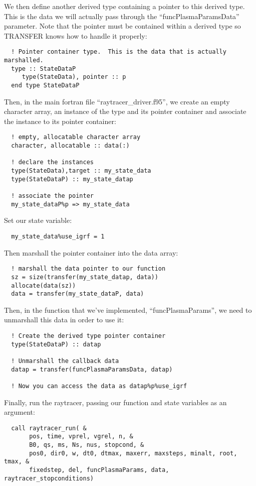 \documentclass[10pt]{article}
\begin{document}
We then define another derived type containing a pointer to this
derived type.  This is the data we will actually pass through the
``funcPlasmaParamsData'' parameter.  Note that the pointer must be
contained within a derived type so TRANSFER knows how to handle it
properly:
\begin{verbatim}
  ! Pointer container type.  This is the data that is actually marshalled.
  type :: StateDataP 
     type(StateData), pointer :: p
  end type StateDataP
\end{verbatim}

Then, in the main fortran file ``raytracer\_driver.f95'', we create an
empty character array, an instance of the type and its pointer
container and associate the instance to its pointer container:
\begin{verbatim}
  ! empty, allocatable character array
  character, allocatable :: data(:)

  ! declare the instances
  type(StateData),target :: my_state_data
  type(StateDataP) :: my_state_datap
  
  ! associate the pointer
  my_state_dataP%p => my_state_data
\end{verbatim}

Set our state variable:
\begin{verbatim}
  my_state_data%use_igrf = 1
\end{verbatim}

Then marshall the pointer container into the data array:
\begin{verbatim}
  ! marshall the data pointer to our function
  sz = size(transfer(my_state_datap, data))
  allocate(data(sz))
  data = transfer(my_state_dataP, data)
\end{verbatim}

Then, in the function that we've implemented, ``funcPlasmaParams'', we
need to unmarshall this data in order to use it:

\begin{verbatim}
  ! Create the derived type pointer container
  type(StateDataP) :: datap

  ! Unmarshall the callback data
  datap = transfer(funcPlasmaParamsData, datap)

  ! Now you can access the data as datap%p%use_igrf
\end{verbatim}

Finally, run the raytracer, passing our function and state variables
as an argument:
\begin{verbatim}
  call raytracer_run( &
       pos, time, vprel, vgrel, n, &
       B0, qs, ms, Ns, nus, stopcond, &
       pos0, dir0, w, dt0, dtmax, maxerr, maxsteps, minalt, root, tmax, &
       fixedstep, del, funcPlasmaParams, data, raytracer_stopconditions)
\end{verbatim}
\end{document}
